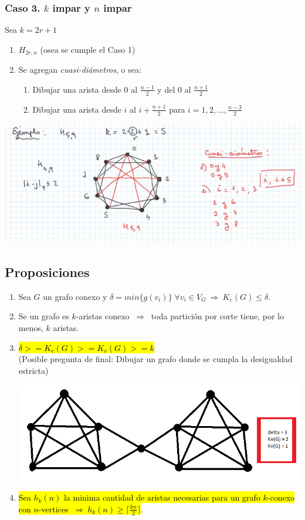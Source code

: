 \documentclass{article}
\newcommand{\Rightarrows}{\: \Rightarrow \:}            %
\begin{document}
\subsubsection*{Caso 3. $k$ impar y $n$ impar}
Sea $k = 2r + 1$
\begin{enumerate}
    \item $H_{2r,n}$ (osea se cumple el Caso 1)
    \item Se agregan \emph{cuasi-diámetros}, o sea:
    \begin{enumerate}
        \item Dibujar una arista desde 0 al $\frac{n-1}{2}$ y del 0 al $\frac{n+1}{2}$
        \item Dibujar una arista desde $i$ al $i + \frac{n+1}{2}$ para $i = 1, 2, ..., \frac{n-3}{2}$
    \end{enumerate}
\end{enumerate}
\begin{center}
    \includegraphics[width=\textwidth]{hararyC3.PNG}
\end{center}


\subsection{Proposiciones}
\begin{enumerate}
    \item Sea $G$ un grafo conexo y $\delta = min\{g(v_i)\} \;\forall v_i \in V_G \Rightarrows K_e(G) \leq \delta$.
    \item Se un grafo es $k$-aristas conexo $\Rightarrows$ toda partición por corte tiene, por lo menos, $k$ aristas.
    \item \hl{$\delta >= K_e(G) >= K_v(G) >= k$} \\(Posible pregunta de final: Dibujar un grafo donde se cumpla la desigualdad estricta)
    \begin{center}
        \includegraphics[width=.50\textwidth]{desigEstricta.PNG}
    \end{center}
    \item \hl{Sea $h_k(n)$ la minima cantidad de aristas necesarias para un grafo $k$-conexo con $n$-vertices $\Rightarrows h_k(n) \geq \lceil\frac{kn}{2}\rceil$}.
\end{enumerate}
\end{document}
